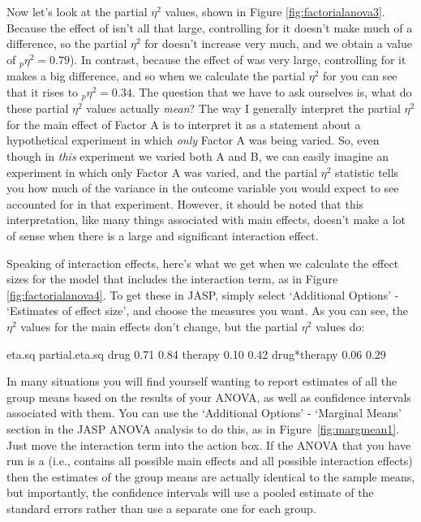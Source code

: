 Now let's look at the partial $\eta^2$ values, shown in Figure \ref{fig:factorialanova3}. Because the effect of  isn't all that large, controlling for it doesn't make much of a difference, so the partial $\eta^2$ for  doesn't increase very much, and we obtain a value of $_p\eta^2 = 0.79$). In contrast, because the effect of  was very large, controlling for it makes a big difference, and so when we calculate the partial $\eta^2$ for  you can see that it rises to $_p\eta^2 = 0.34$. The question that we have to ask ourselves is, what do these partial $\eta^2$ values actually {\it mean}? The way I generally interpret the partial $\eta^2$ for the main effect of Factor A is to interpret it as a statement about a hypothetical experiment in which {\it only} Factor A was being varied. So, even though in {\it this} experiment we varied both A and B, we can easily imagine an experiment in which only Factor A was varied, and the partial $\eta^2$ statistic tells you how much of the variance in the outcome variable you would expect to see accounted for in that experiment. However, it should be noted that this interpretation, like many things associated with main effects, doesn't make a lot of sense when there is a large and significant interaction effect. 

Speaking of interaction effects, here's what we get when we calculate the effect sizes for the model that includes the interaction term, as in Figure \ref{fig:factorialanova4}. To get these in JASP, simply select `Additional Options' - `Estimates of effect size', and choose the measures you want. As you can see, the $\eta^2$ values for the main effects don't change, but the partial $\eta^2$ values do:

\begin{rblock1}
               eta.sq partial.eta.sq
drug            0.71        0.84
therapy         0.10        0.42
drug*therapy    0.06        0.29
\end{rblock1}

\bigskip
{}

In many situations you will find yourself wanting to report estimates of all the group means based on the results of your ANOVA, as well as confidence intervals associated with them. You can use the `Additional Options' - `Marginal Means' section in the JASP ANOVA analysis to do this, as in Figure~\ref{fig:margmean1}. Just move the interaction term  into the action box. If the ANOVA that you have run is a  (i.e., contains all possible main effects and all possible interaction effects) then the estimates of the group means are actually identical to the sample means, but importantly, the confidence intervals will use a pooled estimate of the standard errors rather than use a separate one for each group. 

